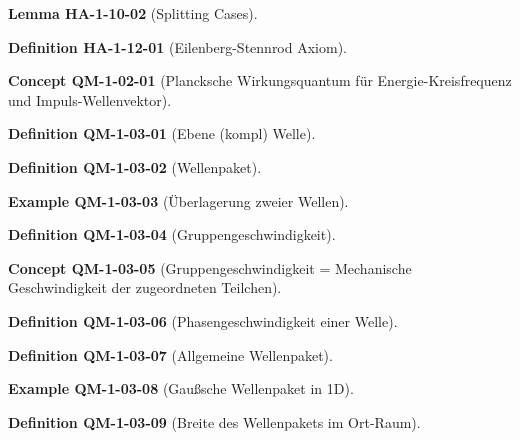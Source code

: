 \documentclass[10pt, letterpaper]{article}
\newcommand{\CustomHeading}[3]{%
  \par\medskip\noindent%
  \textbf{#1 #2} \textnormal{(#3)}.\enskip%
}
\newenvironment{DEF}[2]{\CustomHeading{Definition}{#1}{#2}}{}
\newenvironment{LEM}[2]{\CustomHeading{Lemma}{#1}{#2}}{}
\newenvironment{EXA}[2]{\CustomHeading{Example}{#1}{#2}}{}
\newenvironment{CONC}[2]{\CustomHeading{Concept}{#1}{#2}}{}
\begin{document}
\begin{LEM}{HA-1-10-02}{Splitting Cases}
\end{LEM}

\begin{DEF}{HA-1-12-01}{Eilenberg-Stennrod Axiom}
\end{DEF}

\begin{CONC}{QM-1-02-01}{Plancksche Wirkungsquantum für Energie-Kreisfrequenz und Impuls-Wellenvektor}
\end{CONC}

\begin{DEF}{QM-1-03-01}{Ebene (kompl) Welle}
\end{DEF}

\begin{DEF}{QM-1-03-02}{Wellenpaket}
\end{DEF}

\begin{EXA}{QM-1-03-03}{Überlagerung zweier Wellen}
\end{EXA}

\begin{DEF}{QM-1-03-04}{Gruppengeschwindigkeit}
\end{DEF}

\begin{CONC}{QM-1-03-05}{Gruppengeschwindigkeit = Mechanische Geschwindigkeit der zugeordneten Teilchen}
\end{CONC}

\begin{DEF}{QM-1-03-06}{Phasengeschwindigkeit einer Welle}
\end{DEF}

\begin{DEF}{QM-1-03-07}{Allgemeine Wellenpaket}
\end{DEF}

\begin{EXA}{QM-1-03-08}{Gaußsche Wellenpaket in 1D}
\end{EXA}

\begin{DEF}{QM-1-03-09}{Breite des Wellenpakets im Ort-Raum}
\end{DEF}
\end{document}

